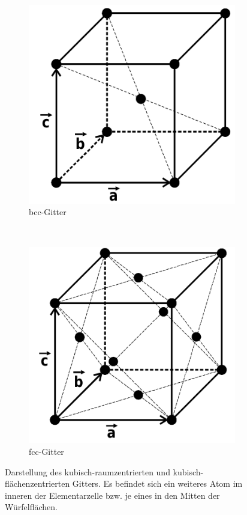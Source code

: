 \begin{figure}[htbp]
	\centering
	\begin{subfigure}[b]{0.3\textwidth}
		\includegraphics[width=\textwidth]{../pics/bcc.png}
		\caption{bcc-Gitter}
		\label{pic:bcc}
	\end{subfigure}
	~ %
	\begin{subfigure}[b]{0.3\textwidth}
		\includegraphics[width=\textwidth]{../pics/fcc.png}
		\caption{fcc-Gitter}
		\label{pic:fcc}
	\end{subfigure}
	\caption{Darstellung des kubisch-raumzentrierten und kubisch-flächenzentrierten Gitters. Es befindet sich ein weiteres Atom im inneren der Elementarzelle bzw. je eines in den Mitten der Würfelflächen.}
	\label{pic:gitterTyp}
\end{figure}
